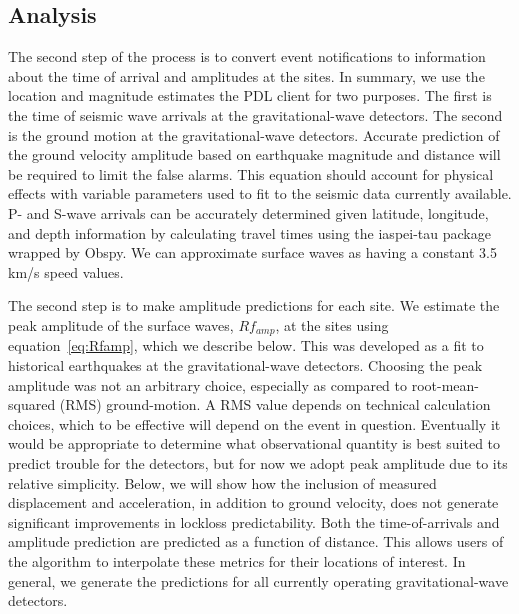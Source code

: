 \documentclass[reprint, prl, aps, showpacs]{revtex4-1}
\begin{document}
\subsection{Analysis}

The second step of the process is to convert event notifications to information about the time of arrival and amplitudes at the sites.
In summary, we use the location and magnitude estimates the PDL client for two purposes. 
The first is the time of seismic wave arrivals at the gravitational-wave detectors.
The second is the ground motion at the gravitational-wave detectors.
Accurate prediction of the ground velocity amplitude based on earthquake magnitude and distance will be required to limit the false alarms. 
This equation should account for physical effects with variable parameters used to fit to the seismic data currently available.
P- and S-wave arrivals can be accurately determined given latitude, longitude, and depth information by calculating travel times using the iaspei-tau package wrapped by Obspy. We can approximate surface waves as having a constant 3.5\,km/s speed values. 

The second step is to make amplitude predictions for each site. 
We estimate the peak amplitude of the surface waves, $Rf_{amp}$, at the sites using equation~\ref{eq:Rfamp}, which we describe below. This was developed as a fit to historical earthquakes at the gravitational-wave detectors.
Choosing the peak amplitude was not an arbitrary choice, especially as compared to root-mean-squared (RMS) ground-motion.
A RMS value depends on technical calculation choices, which to be effective will depend on the event in question.
Eventually it would be appropriate to determine what observational quantity is best suited to predict trouble for the detectors, but for now we adopt peak amplitude due to its relative simplicity.
Below, we will show how the inclusion of measured displacement and acceleration, in addition to ground velocity, does not generate significant improvements in lockloss predictability.
Both the time-of-arrivals and amplitude prediction are predicted as a function of distance. This allows users of the algorithm to interpolate these metrics for their locations of interest. In general, we generate the predictions for all currently operating gravitational-wave detectors.
\end{document}
